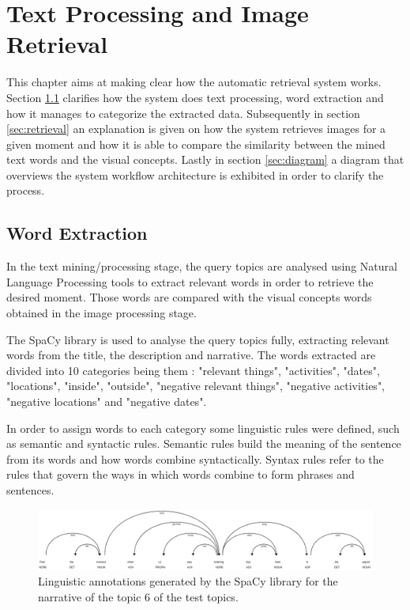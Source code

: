 \cleardoublepage
\chapter{Text Processing and Image Retrieval}
\label{ch:text_stage}

This chapter aims at making clear how the automatic retrieval system works. Section \ref{sec:text} clarifies how the system does text processing, word extraction and how it manages to categorize the extracted data. Subsequently in section \ref{sec:retrieval} an explanation is given on how the system retrieves images for a given moment and how it is able to compare the similarity between the mined text words and the visual concepts. Lastly in section \ref{sec:diagram} a diagram that overviews the system workflow architecture is exhibited in order to clarify the process.



\section{ Word Extraction }
\label{sec:text}

In the text mining/processing stage, the query topics are analysed using Natural Language Processing tools to extract relevant words in order to retrieve the desired moment. Those words are compared with the visual concepts words obtained in the image processing stage. 

The SpaCy library \cite{Spacy2017} is used to analyse the query topics fully, extracting relevant words from the title, the description and narrative. The words extracted are divided into 10 categories being them : "relevant things", "activities", "dates", "locations", "inside", "outside", "negative relevant things", "negative activities", "negative locations" and "negative dates".

In order to assign words to each category some linguistic rules were defined,
such as semantic and syntactic rules. Semantic rules build the meaning of the
sentence from its words and how words combine syntactically. Syntax rules refer to
the rules that govern the ways in which words combine to form phrases and
sentences. 

\begin{figure}[H]
    \centering
    \captionsetup{justification=centering}
    \includegraphics[width =  \textwidth]{Sections/6textprocessing/images/spacy.png}
    \caption{Linguistic annotations generated by the SpaCy library \cite{Spacy2017} for the narrative of the topic 6 of the test topics.}
    \label{fig:spacy_labels}
  \end{figure}
  
